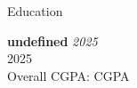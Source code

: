 \documentclass[
	11pt, %
]{resume} %
\begin{document}

\begin{rSection}{Education}
	
	\textbf{undefined} \hfill \textit{2025} \\ 
	 2025 \\
	Overall CGPA: CGPA
	
\end{rSection}

\end{document}
